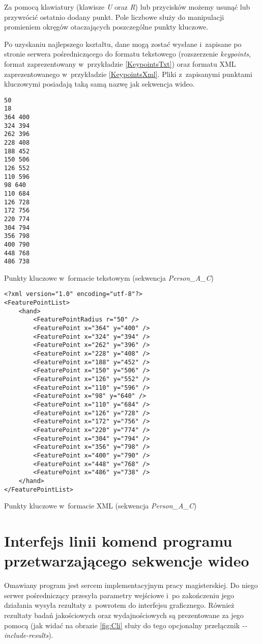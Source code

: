     Za pomocą klawiatury (klawisze \textit{U} oraz \textit{R}) lub przycisków możemy usunąć lub przywrócić ostatnio dodany punkt. Pole liczbowe służy do manipulacji promieniem okręgów otaczających poszczególne punkty kluczowe.

    Po uzyskaniu najlepszego kształtu, dane mogą zostać wysłane i~zapisane po stronie serwera pośredniczącego do formatu tekstowego (rozszerzenie \textit{keypoints}, format zaprezentowany w~przykładzie \ref{KeypointsTxt}) oraz formatu XML zaprezentowanego w~przykładzie \ref{KeypointsXml}. Pliki z~zapisanymi punktami kluczowymi posiadają taką samą nazwę jak sekwencja wideo.

      \begin{sample}[ht]
        \begin{verbatim}
50
18
364 400
324 394
262 396
228 408
188 452
150 506
126 552
110 596
98 640
110 684
126 728
172 756
220 774
304 794
356 798
400 790
448 768
486 738
        \end{verbatim}
        \caption{Punkty kluczowe w~formacie tekstowym (sekwencja \textit{Person\_A\_C})}
        \label{KeypointsTxt}
      \end{sample}

    \newpage
      \begin{sample}[ht]
        \begin{verbatim}
<?xml version="1.0" encoding="utf-8"?>
<FeaturePointList>
    <hand>
        <FeaturePointRadius r="50" />
        <FeaturePoint x="364" y="400" />
        <FeaturePoint x="324" y="394" />
        <FeaturePoint x="262" y="396" />
        <FeaturePoint x="228" y="408" />
        <FeaturePoint x="188" y="452" />
        <FeaturePoint x="150" y="506" />
        <FeaturePoint x="126" y="552" />
        <FeaturePoint x="110" y="596" />
        <FeaturePoint x="98" y="640" />
        <FeaturePoint x="110" y="684" />
        <FeaturePoint x="126" y="728" />
        <FeaturePoint x="172" y="756" />
        <FeaturePoint x="220" y="774" />
        <FeaturePoint x="304" y="794" />
        <FeaturePoint x="356" y="798" />
        <FeaturePoint x="400" y="790" />
        <FeaturePoint x="448" y="768" />
        <FeaturePoint x="486" y="738" />
    </hand>
</FeaturePointList>
        \end{verbatim}
        \caption{Punkty kluczowe w~formacie XML (sekwencja \textit{Person\_A\_C})}
        \label{KeypointsXml}
      \end{sample}


  \section{Interfejs linii komend programu przetwarzającego sekwencje wideo}\label{Section_CLI}
    Omawiany program jest sercem implementacyjnym pracy magisterskiej. Do niego serwer pośredniczący przesyła parametry wejściowe i~po zakończeniu jego działania wysyła rezultaty z~powrotem do interfejsu graficznego. Również rezultaty badań jakościowych oraz wydajnościowych są prezentowane za jego pomocą (jak widać na obrazie \ref{fig:Cli} służy do tego opcjonalny przełącznik \textit{-{}-include-results}).

